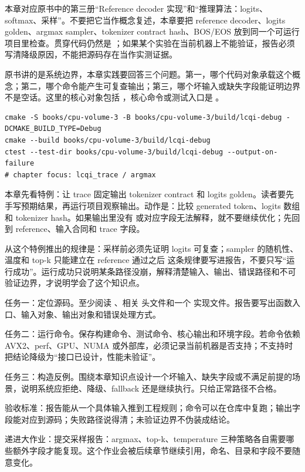 
本章对应原书中的第三册“Reference decoder 实现”和“推理算法：logits、softmax、采样”。不要把它当作概念复述，本章要把 reference decoder、logits golden、argmax sampler、tokenizer contract hash、BOS/EOS 放到同一个可运行项目里检查。贯穿代码仍然是 ；如果某个实验在当前机器上不能验证，报告必须写清降级原因，不能把源码存在当作实测证据。


原书讲的是系统边界，本章实践要回答三个问题。第一，哪个代码对象承载这个概念；第二，哪个命令能产生可复查输出；第三，哪个坏输入或缺失字段能证明边界不是空话。这里的核心对象包括 ，核心命令或测试入口是 。

\begin{lstlisting}[numbers=none,caption={第 6 章实践：Reference Decoder、logits 与采样 的最小命令入口}]
cmake -S books/cpu-volume-3 -B books/cpu-volume-3/build/lcqi-debug -DCMAKE_BUILD_TYPE=Debug
cmake --build books/cpu-volume-3/build/lcqi-debug
ctest --test-dir books/cpu-volume-3/build/lcqi-debug --output-on-failure
# chapter focus: lcqi_trace / argmax
\end{lstlisting}


本章先看特例：让 trace 固定输出 tokenizer contract 和 logits golden。读者要先手写预期结果，再运行项目观察输出。动作是：比较 generated token、logits 数组和 tokenizer hash。如果输出里没有  或对应字段无法解释，就不要继续优化；先回到 reference、输入合同和 trace 字段。

从这个特例推出的规律是：采样前必须先证明 logits 可复查；sampler 的随机性、温度和 top-k 只能建立在 reference 通过之后 这条规律要写进报告，不要只写“运行成功”。运行成功只说明某条路径没崩，解释清楚输入、输出、错误路径和不可验证边界，才说明学会了这个知识点。


任务一：定位源码。至少阅读 、相关  头文件和一个  实现文件。报告要写出函数入口、输入对象、输出对象和错误处理方式。

任务二：运行命令。保存构建命令、测试命令、核心输出和环境字段。若命令依赖 AVX2、perf、GPU、NUMA 或外部库，必须记录当前机器是否支持；不支持时把结论降级为“接口已设计，性能未验证”。

任务三：构造反例。围绕本章知识点设计一个坏输入、缺失字段或不满足前提的场景，说明系统应拒绝、降级、fallback 还是继续执行。只给正常路径不合格。


验收标准：报告能从一个具体输入推到工程规则；命令可以在仓库中复跑；输出字段能对应到源码；失败路径说得清；未验证边界不伪装成结论。

递进大作业：提交采样报告：argmax、top-k、temperature 三种策略各自需要哪些额外字段才能复现。这个作业会被后续章节继续引用，命名、目录和字段不要随意变化。
